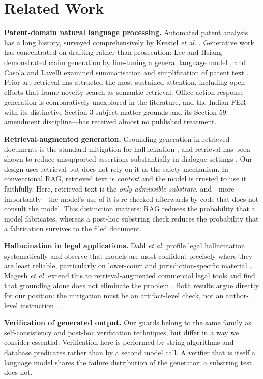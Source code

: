 \documentclass[conference]{IEEEtran}
\begin{document}
\section{Related Work}

\textbf{Patent-domain natural language processing.} Automated patent analysis has a long history, surveyed comprehensively by Krestel \emph{et al.} \cite{krestel2021}. Generative work has concentrated on drafting rather than prosecution: Lee and Hsiang demonstrated claim generation by fine-tuning a general language model \cite{lee2020}, and Casola and Lavelli examined summarisation and simplification of patent text \cite{casola2022}. Prior-art retrieval has attracted the most sustained attention, including open efforts that frame novelty search as semantic retrieval. Office-action response generation is comparatively unexplored in the literature, and the Indian FER---with its distinctive Section 3 subject-matter grounds and its Section 59 amendment discipline---has received almost no published treatment.

\textbf{Retrieval-augmented generation.} Grounding generation in retrieved documents is the standard mitigation for hallucination \cite{lewis2020}, and retrieval has been shown to reduce unsupported assertions substantially in dialogue settings \cite{shuster2021}. Our design uses retrieval but does not rely on it as the safety mechanism. In conventional RAG, retrieved text is \emph{context} and the model is trusted to use it faithfully. Here, retrieved text is the \emph{only admissible substrate}, and---more importantly---the model's use of it is re-checked afterwards by code that does not consult the model. This distinction matters: RAG reduces the probability that a model fabricates, whereas a post-hoc substring check reduces the probability that a fabrication survives to the filed document.

\textbf{Hallucination in legal applications.} Dahl \emph{et al.} profile legal hallucination systematically and observe that models are most confident precisely where they are least reliable, particularly on lower-court and jurisdiction-specific material \cite{dahl2024}. Magesh \emph{et al.} extend this to retrieval-augmented commercial legal tools and find that grounding alone does not eliminate the problem \cite{magesh2025}. Both results argue directly for our position: the mitigation must be an artifact-level check, not an author-level instruction \cite{ji2023}.

\textbf{Verification of generated output.} Our guards belong to the same family as self-consistency and post-hoc verification techniques, but differ in a way we consider essential. Verification here is performed by string algorithms and database predicates rather than by a second model call. A verifier that is itself a language model shares the failure distribution of the generator; a substring test does not.
\end{document}
